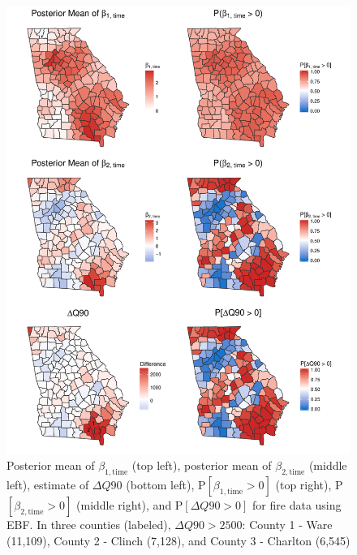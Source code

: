 \begin{figure}[htbp]  %
  \centering
  \includegraphics[height=0.9\textheight]{plots/fire-ebf-postpanel.pdf}
  \caption{Posterior mean of $\beta_{1, \text{time}}$ (top left), posterior mean of $\beta_{2, \text{time}}$ (middle left), estimate of $\Delta Q90$ (bottom left), P$[\beta_{1, \text{time}} > 0]$ (top right), P$[\beta_{2, \text{time}} > 0]$ (middle right), and P$[\Delta Q90 > 0]$ for fire data using EBF. In three counties (labeled), $\Delta Q90 > 2500$: County 1 - Ware (11,109), County 2 - Clinch (7,128), and County 3 - Charlton (6,545)}
  \label{ebfig:fire-ebf-postpanel}
\end{figure}


